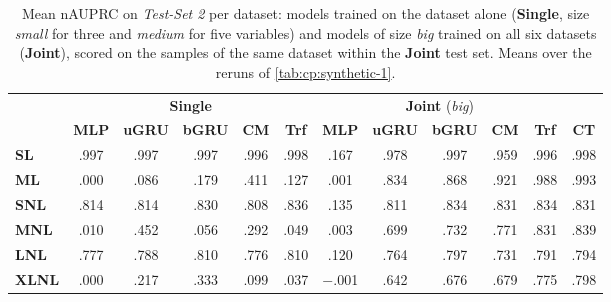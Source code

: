 \begin{table}[ht]
    \centering
    \small
    \setlength{\tabcolsep}{4pt}
    \begin{tabular}{lccccc|ccccc|c}
    \toprule
        ~ & \multicolumn{5}{c|}{\textbf{Single}} & \multicolumn{5}{c|}{\textbf{Joint} (\emph{big})} & ~ \\
        ~ & \textbf{MLP} & \textbf{uGRU} & \textbf{bGRU} & \textbf{CM} & \textbf{Trf} & \textbf{MLP} & \textbf{uGRU} & \textbf{bGRU} & \textbf{CM} & \textbf{Trf} & \textbf{CT} \\
    \midrule
        \textbf{SL} & .997 & .997 & .997 & .996 & .998 & .167 & .978 & .997 & .959 & .996 & .998 \\
        \textbf{ML} & .000 & .086 & .179 & .411 & .127 & .001 & .834 & .868 & .921 & .988 & .993 \\
        \textbf{SNL} & .814 & .814 & .830 & .808 & .836 & .135 & .811 & .834 & .831 & .834 & .831 \\
        \textbf{MNL} & .010 & .452 & .056 & .292 & .049 & .003 & .699 & .732 & .771 & .831 & .839 \\
        \textbf{LNL} & .777 & .788 & .810 & .776 & .810 & .120 & .764 & .797 & .731 & .791 & .794 \\
        \textbf{XLNL} & .000 & .217 & .333 & .099 & .037 & $-$.001 & .642 & .676 & .679 & .775 & .798 \\
    \bottomrule
    \end{tabular}
    \caption{Mean nAUPRC on \textit{Test-Set 2} per dataset: models trained on the dataset alone (\textbf{Single}, size \emph{small} for three and \emph{medium} for five variables) and models of size \emph{big} trained on all six datasets (\textbf{Joint}), scored on the samples of the same dataset within the \textbf{Joint} test set. Means over the reruns of \cref{tab:cp:synthetic-1}.}
\label{tab:cp:joint-subsets}
\end{table}
